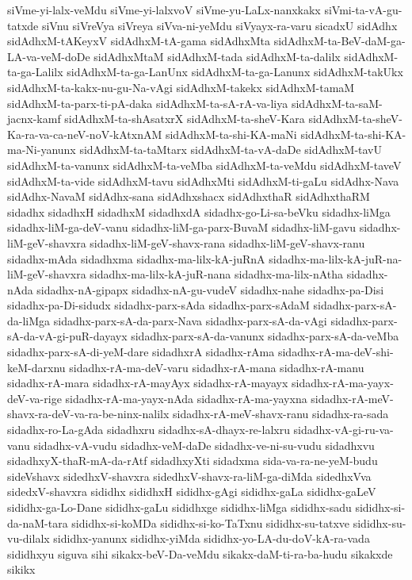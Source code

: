 {siVme-yi-lalx-veMdu
siVme-yi-lalxvoV
siVme-yu-LaLx-nanxkakx
siVmi-ta-vA-gu-tatxde
siVnu
siVreVya
siVreya
siVva-ni-yeMdu
siVyayx-ra-varu
sicadxU
sidAdhx
sidAdhxM-tAKeyxV
sidAdhxM-tA-gama
sidAdhxMta
sidAdhxM-ta-BeV-daM-ga-LA-va-veM-doDe
sidAdhxMtaM
sidAdhxM-tada
sidAdhxM-ta-dalilx
sidAdhxM-ta-ga-Lalilx
sidAdhxM-ta-ga-LanUnx
sidAdhxM-ta-ga-Lanunx
sidAdhxM-takUkx
sidAdhxM-ta-kakx-nu-gu-Na-vAgi
sidAdhxM-takekx
sidAdhxM-tamaM
sidAdhxM-ta-parx-ti-pA-daka
sidAdhxM-ta-sA-rA-va-liya
sidAdhxM-ta-saM-jacnx-kamf
sidAdhxM-ta-shAsatxrX
sidAdhxM-ta-sheV-Kara
sidAdhxM-ta-sheV-Ka-ra-va-ca-neV-noV-kAtxnAM
sidAdhxM-ta-shi-KA-maNi
sidAdhxM-ta-shi-KA-ma-Ni-yanunx
sidAdhxM-ta-taMtarx
sidAdhxM-ta-vA-daDe
sidAdhxM-tavU
sidAdhxM-ta-vanunx
sidAdhxM-ta-veMba
sidAdhxM-ta-veMdu
sidAdhxM-taveV
sidAdhxM-ta-vide
sidAdhxM-tavu
sidAdhxMti
sidAdhxM-ti-gaLu
sidAdhx-Nava
sidAdhx-NavaM
sidAdhx-sana
sidAdhxshacx
sidAdhxthaR
sidAdhxthaRM
sidadhx
sidadhxH
sidadhxM
sidadhxdA
sidadhx-go-Li-sa-beVku
sidadhx-liMga
sidadhx-liM-ga-deV-vanu
sidadhx-liM-ga-parx-BuvaM
sidadhx-liM-gavu
sidadhx-liM-geV-shavxra
sidadhx-liM-geV-shavx-rana
sidadhx-liM-geV-shavx-ranu
sidadhx-mAda
sidadhxma
sidadhx-ma-lilx-kA-juRnA
sidadhx-ma-lilx-kA-juR-na-liM-geV-shavxra
sidadhx-ma-lilx-kA-juR-nana
sidadhx-ma-lilx-nAtha
sidadhx-nAda
sidadhx-nA-gipapx
sidadhx-nA-gu-vudeV
sidadhx-nahe
sidadhx-pa-Disi
sidadhx-pa-Di-sidudx
sidadhx-parx-sAda
sidadhx-parx-sAdaM
sidadhx-parx-sA-da-liMga
sidadhx-parx-sA-da-parx-Nava
sidadhx-parx-sA-da-vAgi
sidadhx-parx-sA-da-vA-gi-puR-dayayx
sidadhx-parx-sA-da-vanunx
sidadhx-parx-sA-da-veMba
sidadhx-parx-sA-di-yeM-dare
sidadhxrA
sidadhx-rAma
sidadhx-rA-ma-deV-shi-keM-darxnu
sidadhx-rA-ma-deV-varu
sidadhx-rA-mana
sidadhx-rA-manu
sidadhx-rA-mara
sidadhx-rA-mayAyx
sidadhx-rA-mayayx
sidadhx-rA-ma-yayx-deV-va-rige
sidadhx-rA-ma-yayx-nAda
sidadhx-rA-ma-yayxna
sidadhx-rA-meV-shavx-ra-deV-va-ra-be-ninx-nalilx
sidadhx-rA-meV-shavx-ranu
sidadhx-ra-sada
sidadhx-ro-La-gAda
sidadhxru
sidadhx-sA-dhayx-re-lalxru
sidadhx-vA-gi-ru-va-vanu
sidadhx-vA-vudu
sidadhx-veM-daDe
sidadhx-ve-ni-su-vudu
sidadhxvu
sidadhxyX-thaR-mA-da-rAtf
sidadhxyXti
sidadxma
sida-va-ra-ne-yeM-budu
sideVshavx
sidedhxV-shavxra
sidedhxV-shavx-ra-liM-ga-diMda
sidedhxVva
sidedxV-shavxra
sididhx
sididhxH
sididhx-gAgi
sididhx-gaLa
sididhx-gaLeV
sididhx-ga-Lo-Dane
sididhx-gaLu
sididhxge
sididhx-liMga
sididhx-sadu
sididhx-si-da-naM-tara
sididhx-si-koMDa
sididhx-si-ko-TaTxnu
sididhx-su-tatxve
sididhx-su-vu-dilalx
sididhx-yanunx
sididhx-yiMda
sididhx-yo-LA-du-doV-kA-ra-vada
sididhxyu
siguva
sihi
sikakx-beV-Da-veMdu
sikakx-daM-ti-ra-ba-hudu
sikakxde
sikikx
}
